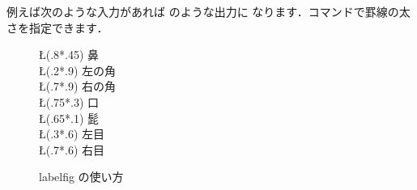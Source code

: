 例えば次のような入力があれば  のような出力に
なります．コマンドで罫線の太さを指定できます．
\begin{InText}
\begin{figure}[htbp]
\begin{center}
 \GridLineWidth{.2pt}
 \SetLabels 
  \T\L(.8*.45) 鼻\\
  \T\L(.2*.9) 左の角\\
  \T\L(.7*.9) 右の角\\ 
  \T\L(.75*.3)  口\\ 
  \T\L(.65*.1) 髭\\ 
  \T\L(.3*.6) 左目\\ 
  \T\L(.7*.6)  右目\\ 
 \endSetLabels
 \ifdraft
   \ShowGrid
 \fi
 \strut{}%
 \caption{labelfig の使い方\label{fig:you}}%
\end{center} 
\end{figure} 
\end{InText}

